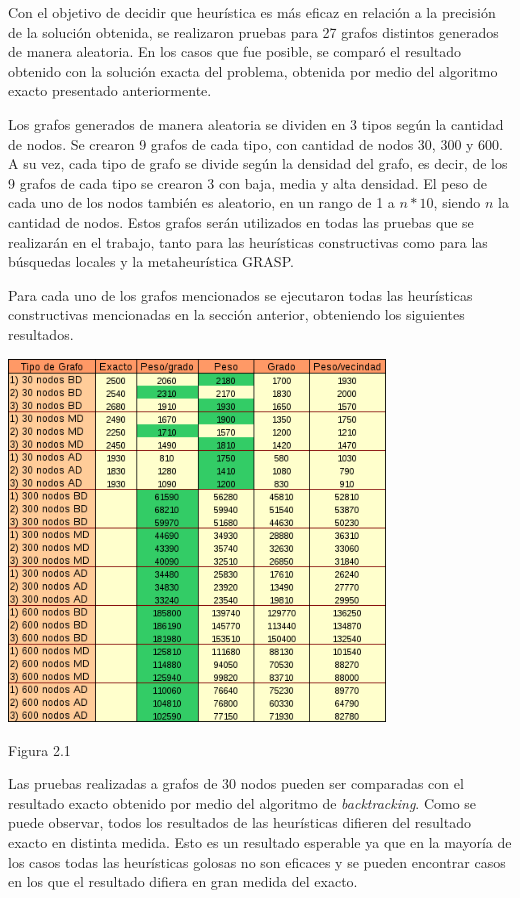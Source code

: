 \documentclass[a4paper,11pt] {article}
\begin{document}
Con el objetivo de decidir que heur\'istica es m\'as eficaz en relaci\'on a la precisi\'on de la soluci\'on obtenida, se realizaron pruebas para 27 grafos distintos generados de manera aleatoria. En los casos que fue posible, se compar\'o el resultado obtenido con la soluci\'on exacta del problema, obtenida por medio del algoritmo exacto presentado anteriormente.

Los grafos generados de manera aleatoria se dividen en 3 tipos seg\'un la cantidad de nodos. Se crearon 9 grafos de cada tipo, con cantidad de nodos 30, 300 y 600. A su vez, cada tipo de grafo se divide seg\'un la densidad del grafo, es decir, de los 9 grafos de cada tipo se crearon 3 con baja, media y alta densidad. El peso de cada uno de los nodos tambi\'en es aleatorio, en un rango de 1 a $n*10$, siendo $n$ la cantidad de nodos. Estos grafos ser\'an utilizados en todas las pruebas que se realizar\'an en el trabajo, tanto para las heur\'isticas constructivas como para las b\'usquedas locales y la metaheur\'istica GRASP.

Para cada uno de los grafos mencionados se ejecutaron todas las heur\'isticas constructivas mencionadas en la secci\'on anterior, obteniendo los siguientes resultados.

\begin{center}
 \includegraphics[width=0.75\textwidth]{tablas/tablaHC.png}
\begin{center}
Figura 2.1
\end{center}
\end{center}

Las pruebas realizadas a grafos de 30 nodos pueden ser comparadas con el resultado exacto obtenido por medio del algoritmo de \textit{backtracking}. Como se puede observar, todos los resultados de las heur\'isticas difieren del resultado exacto en distinta medida. Esto es un resultado esperable ya que en la mayor\'ia de los casos todas las heur\'isticas golosas no son eficaces y se pueden encontrar casos en los que el resultado difiera en gran medida del exacto.
\end{document}
